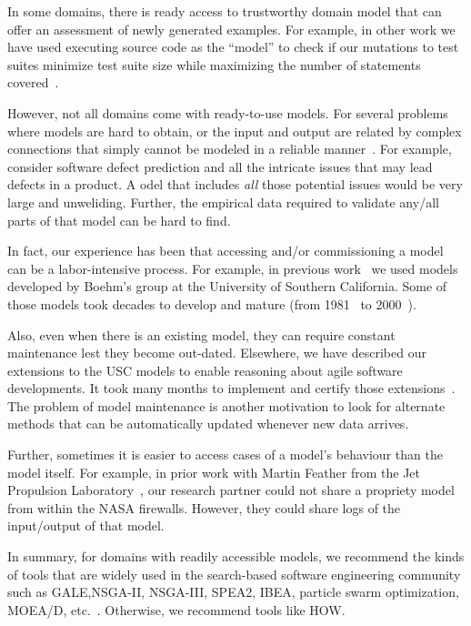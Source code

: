 \documentclass[conference]{IEEEtran}
\begin{document}
In some domains, there is ready access to 
trustworthy domain model that can offer an assessment
of newly generated examples. For example, in other work
we have used executing source code as the ``model'' to check
if our mutations to test suites
  minimize
test suite size while maximizing the number of statements covered~\cite{me09m,andrews07,andrews10}.

However, not all domains come with ready-to-use models.
For   several problems where models are hard to obtain, or the input and output are related by complex connections that simply cannot be modeled in a reliable manner~\cite{Ludewig2003}. For example, 
consider software defect prediction and all the intricate issues that may lead defects in a product. A odel that includes {\em all} those
potential issues would be very large and unweliding. Further,
the empirical data required to validate any/all parts
of that model can be hard to find.



In fact, our experience has been that accessing and/or commissioning
a model can be a labor-intensive process.
For  example, in previous work~\cite{me07f} we used models
developed by Boehm's group at the University of Southern California.
Some of those models took decades to develop and mature (from 1981~\cite{boehm81} to 2000~\cite{boehm00b}). 

Also, even when there is an existing model, they can require
constant  maintenance lest they become out-dated. Elsewhere, we have described our
extensions to the USC models to enable reasoning about agile software developments. 
It took many months to implement and certify those extensions~\cite{me09i,me09j}.
The problem of model maintenance is another
motivation to look for alternate methods that can be automatically updated whenever new data arrives.

Further, sometimes  it is easier to access cases of a model's behaviour than the model
itself. For example, in prior work with Martin  Feather from the Jet Propulsion
Laboratory~\cite{fea02a},  our research partner could not share a
propriety model from within the NASA firewalls. However, they could share 
logs of the input/output of that model.

In summary, for domains with readily accessible models, we recommend
the kinds of tools that are widely used in the search-based
software engineering community such as GALE,NSGA-II, NSGA-III, SPEA2, IBEA, particle swarm optimization, MOEA/D, etc.~\cite{krall14,deb00a,zit02,zit04,%
deb14,Cui2005a,zhang07:TEC}. Otherwise, we recommend tools like HOW.
\end{document}
